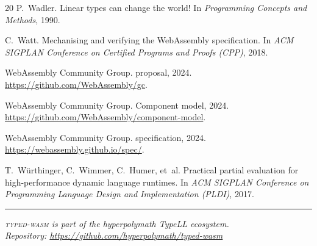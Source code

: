 \documentclass[11pt,a4paper]{article}
\newcommand{\typedwasm}{\textsc{typed-wasm}}
\begin{document}
\begin{thebibliography}{20}
P.~Wadler.
\newblock Linear types can change the world!
\newblock In \emph{Programming Concepts and Methods}, 1990.

C.~Watt.
\newblock Mechanising and verifying the {WebAssembly} specification.
\newblock In \emph{ACM SIGPLAN Conference on Certified Programs and Proofs
  (CPP)}, 2018.

{WebAssembly Community Group}.
 proposal, 2024.
\newblock \url{https://github.com/WebAssembly/gc}.

{WebAssembly Community Group}.
\newblock Component model, 2024.
\newblock \url{https://github.com/WebAssembly/component-model}.

{WebAssembly Community Group}.
 specification, 2024.
\newblock \url{https://webassembly.github.io/spec/}.

T.~W\"urthinger, C.~Wimmer, C.~Humer, et~al.
\newblock Practical partial evaluation for high-performance dynamic language
  runtimes.
\newblock In \emph{ACM SIGPLAN Conference on Programming Language Design and
  Implementation (PLDI)}, 2017.

\end{thebibliography}

\bigskip
\noindent\rule{\textwidth}{0.4pt}

\smallskip
\noindent\emph{\typedwasm{} is part of the hyperpolymath TypeLL ecosystem.}\\
\noindent\emph{Repository: \url{https://github.com/hyperpolymath/typed-wasm}}
\end{document}
